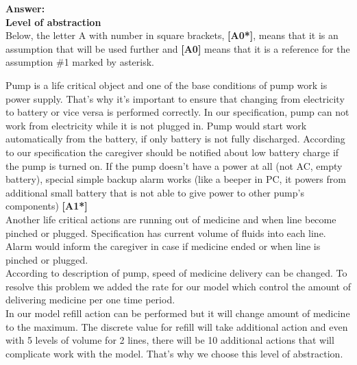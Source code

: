 \documentclass{article}
\begin{document}
\textbf{Answer:}\\

\textbf{Level of abstraction}\\
Below, the letter A with number in square brackets, \textbf{[A0*]}, means that it is an assumption that will be used further and \textbf{[A0]} means that it is a reference for the assumption \#1 marked by asterisk.

Pump is a life critical object and one of the base conditions of pump work is power supply. That's why it's important to ensure that changing from electricity to battery or vice versa is performed correctly. In our specification, pump can not work from electricity while it is not plugged in. Pump would start work automatically from the battery, if only battery is not fully discharged. According to our specification the caregiver should be notified about low battery charge if the pump is turned on. If the pump doesn’t have a power at all (not AC, empty battery), special simple backup alarm works (like a beeper in PC, it powers from additional small battery that is not able to give power to other pump’s components) \textbf{[A1*]}\\
Another life critical actions are running out of medicine and when line become pinched or plugged. Specification has current volume of fluids into each line. Alarm would inform the caregiver in case if medicine ended or when line is pinched or plugged. \\
According to description of pump, speed of medicine delivery can be changed. To resolve this problem we added the rate for our model which control the amount of delivering medicine per one time period. \\
In our model refill action can be performed but it will change amount of medicine to the maximum. The discrete value for refill will take additional action and even with 5 levels of volume for 2 lines, there will be 10 additional actions that will complicate work with the model. That's why we choose this level of abstraction. \\
\end{document}
